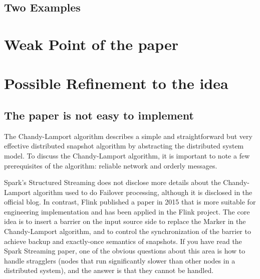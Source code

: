 \documentclass[acmlarge]{acmart}
\begin{document}
\subsection{Two Examples}
\section {Weak Point of the paper}

\section{Possible Refinement to the idea}
\subsection {The paper is not easy to implement}
The Chandy-Lamport algorithm describes a simple and straightforward but very effective distributed snapshot algorithm by abstracting the distributed system model. To discuss the Chandy-Lamport algorithm, it is important to note a few prerequisites of the algorithm: reliable network and orderly messages.

Spark's \cite{zaharia2010spark} Structured Streaming does not disclose more details about the Chandy-Lamport algorithm used to do Failover processing, although it is disclosed in the official blog. In contrast, Flink published a paper in 2015 \cite{carbone2015lightweight} that is more suitable for engineering implementation and has been applied in the Flink project. The core idea is to insert a barrier on the input source side to replace the Marker in the Chandy-Lamport algorithm, and to control the synchronization of the barrier to achieve backup and exactly-once semantics of snapshots. If you have read the Spark Streaming paper, one of the obvious questions about this area is how to handle stragglers (nodes that run significantly slower than other nodes in a distributed system), and the answer is that they cannot be handled.



\end{document}
